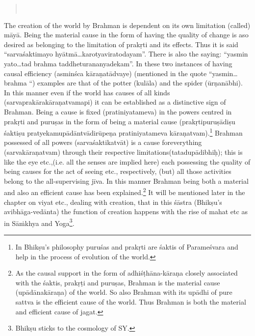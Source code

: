 \begin{verse}
\\
\end{verse}

The creation of the world by Brahman is dependent on its own limitation (called) māyā. Being the material cause in the form of having the quality of change is aso desired as belonging to the limitation of prakṛti and its effects. Thus it is said “sarvaśaktimayo hyātmā…karotyavirato\-dayam”. There is also the saying: “yasmin yato…tad brahma taddheturananyadekam”. In these two instances of having causal efficiency (asminśca kāraṇatādvaye) (mentioned in the quote “yasmin…brahma “) examples are that of the potter (kulāla) and the spider (ūrṇanābhi). In this manner even if the world has causes of all kinds (sarvaprakārakāra\-ṇatvamapi) it can be established as a distinctive sign of Brahman. Being a cause is fixed (pratiniyatameva) in the powers centred in prakṛti and puruṣas in the form of being a material cause (prakṛtipuruṣādiṣu śaktiṣu pratyekamupādāntvādirūpeṇa pratiniyatameva kāraṇatvam).\footnote{In Bhikṣu’s philosophy puruśas and prakṛti are śaktis of Parameśvara and help in the process of evolution of the world.} Brahman possessed of all powers (sarvaśaktikatvāt) is a cause for\break everything (sarvakāraṇatvam) through their respective limitations\break (tatadupādibhiḥ);  this is like the eye etc.,(i.e. all the senses are implied here) each possessing the quality of being causes for the act of seeing etc., respectively, (but) all those activities belong to the all-supervising jīva. In this manner Brahman being both a material and also an efficient cause has been explained.\footnote{As the causal support in the form of adhiśṭhāna-kāraṇa closely associated with the śaktis, prakṛṭi and puruṣas, Brahman is the material cause (upādānakāraṇa) of the world. So also Brahman with its upādhi of pure sattva is the efficient cause of the world. Thus Brahman is both the material and efficient cause of jagat.}  It will be mentioned later in the chapter on viyat etc., dealing with creation, that in this śāstra (Bhikṣu’s avibhāga-vedānta) the function of creation happens with the rise of mahat etc as in Sāṁkhya and Yoga\footnote{Bhikṣu sticks to the cosmology of SY.}. 

